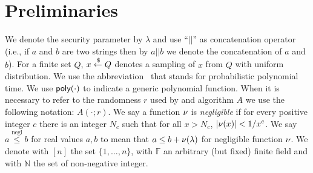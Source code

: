 \section{Preliminaries}
We denote the security parameter by $\lambda$ and use ``$||$'' as concatenation operator 
(i.e., if $a$ and $b$ are two strings then by $a||b$ we denote the concatenation of $a$ and $b$). 
For a finite set $Q$, $x\xleftarrow{\text{\$}} Q$ denotes a sampling of $x$ from $Q$ 
with uniform distribution. 
We use the abbreviation \ppt\ that stands for probabilistic polynomial time. We use $\textsf{poly}(\cdot)$
 to indicate a generic polynomial function. 
When it is necessary to refer to the randomness $r$ used by and algorithm $A$ we use the following notation: $A(\cdot;r)$.
We say a function $\nu$ is {\em negligible} if for every positive integer $c$ there is an integer $N_c$ such that for all $x > N_c$, $|\nu(x)|< 1/x^c$.
We say $a \stackrel{\text{negl}}{\leq} b$ for real values $a, b$ to mean that $a \leq b + \nu(\lambda)$ for negligible function $\nu$.
We denote with $[n]$ the set  $\{1,\dots,n\}$, with $\mathbb{F}$ an arbitrary (but fixed) finite field and with $\mathbb{N}$ the set of non-negative integer.







